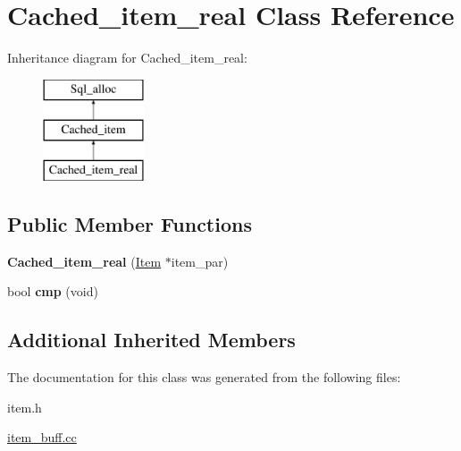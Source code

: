 \hypertarget{classCached__item__real}{}\section{Cached\+\_\+item\+\_\+real Class Reference}
\label{classCached__item__real}
Inheritance diagram for Cached\+\_\+item\+\_\+real\+:\begin{figure}[H]
\begin{center}
\leavevmode
\includegraphics[height=3.000000cm]{classCached__item__real}
\end{center}
\end{figure}
\subsection*{Public Member Functions}
\begin{DoxyCompactItemize}
\item 
\mbox{\label{classCached__item__real_a2c0fe1ce2808d7d3c6f7aa3aa28b4460}} 
{\bfseries Cached\+\_\+item\+\_\+real} (\mbox{\hyperlink{classItem}{Item}} $\ast$item\+\_\+par)
\item 
\mbox{\label{classCached__item__real_ac1a6de776773bf18b3d80ab7535defb7}} 
bool {\bfseries cmp} (void)
\end{DoxyCompactItemize}
\subsection*{Additional Inherited Members}


The documentation for this class was generated from the following files\+:\begin{DoxyCompactItemize}
\item 
item.\+h\item 
\mbox{\hyperlink{item__buff_8cc}{item\+\_\+buff.\+cc}}\end{DoxyCompactItemize}
